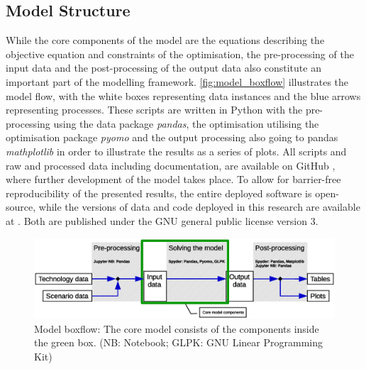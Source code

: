 \documentclass[article]{elsarticle}
\begin{document}
\subsection{Model Structure}
\label{subsec:Structure}
While the core components of the model are the equations describing the objective equation and constraints of the optimisation, the pre-processing of the input data and the post-processing of the output data also constitute an important part of the modelling framework. \autoref{fig:model_boxflow} illustrates the model flow, with the white boxes representing data instances and the blue arrows representing processes. These scripts are written in Python with the pre-processing using the data package \textit{pandas}, the optimisation utilising the optimisation package \textit{pyomo} and the output processing also going to pandas \textit{mathplotlib} in order to illustrate the results as a series of plots. All scripts and raw and processed data including documentation, are available on GitHub \cite{GitHub2018}, where further development of the model takes place. To allow for barrier-free reproducibility of the presented results, the entire deployed software is open-source, while the versions of data and code deployed in this research are available at \cite{Zenodo2018}. Both are published under the GNU general public license version 3.

\begin{figure}[tbh]
    \centering
    \includegraphics[width=\textwidth]{figures/model_boxflow_paper.eps}
    \caption{Model boxflow: The core model consists of the components inside the green box. (NB: Notebook; GLPK: GNU Linear Programming Kit)}
    \label{fig:model_boxflow}
\end{figure}
\end{document}
